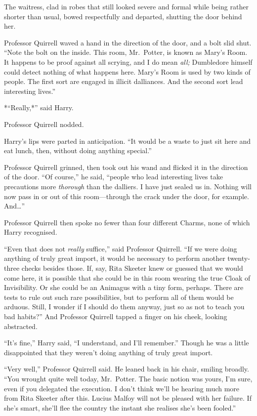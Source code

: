 The waitress, clad in robes that still looked severe and formal while
being rather shorter than usual, bowed respectfully and departed,
shutting the door behind her.

Professor Quirrell waved a hand in the direction of the door, and a bolt
slid shut. ``Note the bolt on the inside. This room, Mr.~Potter, is
known as Mary's Room. It happens to be proof against all scrying, and I
do mean \emph{all;} Dumbledore himself could detect nothing of what
happens here. Mary's Room is used by two kinds of people. The first sort
are engaged in illicit dalliances. And the second sort lead interesting
lives.''

*``Really,*'' said Harry.

Professor Quirrell nodded.

Harry's lips were parted in anticipation. ``It would be a waste to just
sit here and eat lunch, then, without doing anything special.''

Professor Quirrell grinned, then took out his wand and flicked it in the
direction of the door. ``Of course,'' he said, ``people who lead
interesting lives take precautions more \emph{thorough} than the
dalliers. I have just sealed us in. Nothing will now pass in or out of
this room---through the crack under the door, for example. And\ldots{}''

Professor Quirrell then spoke no fewer than four different Charms, none
of which Harry recognised.

``Even that does not \emph{really} suffice,'' said Professor Quirrell.
``If we were doing anything of truly great import, it would be necessary
to perform another twenty-three checks besides those. If, say, Rita
Skeeter knew or guessed that we would come here, it is possible that she
could be in this room wearing the true Cloak of Invisibility. Or she
could be an Animagus with a tiny form, perhaps. There are tests to rule
out such rare possibilities, but to perform all of them would be
arduous. Still, I wonder if I should do them anyway, just so as not to
teach you bad habits?'' And Professor Quirrell tapped a finger on his
cheek, looking abstracted.

``It's fine,'' Harry said, ``I understand, and I'll remember.'' Though
he was a little disappointed that they weren't doing anything of truly
great import.

``Very well,'' Professor Quirrell said. He leaned back in his chair,
smiling broadly. ``You wrought quite well today, Mr.~Potter. The basic
notion was yours, I'm sure, even if you delegated the execution. I don't
think we'll be hearing much more from Rita Skeeter after this. Lucius
Malfoy will not be pleased with her failure. If she's smart, she'll flee
the country the instant she realises she's been fooled.''

